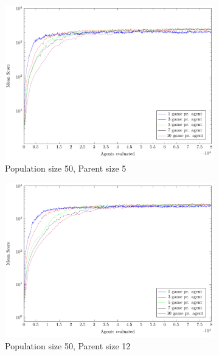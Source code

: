 \begin{figure}
	\centering
	\captionsetup[subfigure]{justification=centering}
    \begin{subfigure}[b]{0.49\textwidth}
    	\caption{Population size 50, Parent size 5}
        \includegraphics[width=\textwidth]{data/ce_population_offspring/50x_split/constant_l50_o5/mean/PlotFile.pdf}
    \end{subfigure} 
    \begin{subfigure}[b]{0.49\textwidth}
    	\caption{Population size 50, Parent size 12}
        \includegraphics[width=\textwidth]{data/ce_population_offspring/50x_split/constant_l50_o12/mean/PlotFile.pdf}
    \end{subfigure}
    \begin{subfigure}[b]{0.49\textwidth}

\end{subfigure}
\end{figure}
